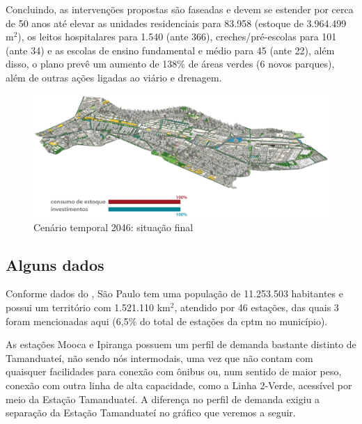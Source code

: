 	Concluindo, as intervenções propostas são faseadas e devem se estender por cerca de 50 anos até elevar as unidades residenciais para 83.958 (estoque de 3.964.499 m$^2$), os leitos hospitalares para 1.540 (ante 366), creches/pré-escolas para 101 (ante 34) e as escolas de ensino fundamental e médio para 45 (ante 22), além disso, o plano prevê um aumento de 138\% de áreas verdes (6 novos parques), além de outras ações ligadas ao viário e drenagem\cite{smdu2014}.
	
	\begin{figure}[h]
		\caption{Cenário temporal 2046: situação final \cite{smdu2014}}
		\includegraphics[keepaspectratio,width=\textwidth]{oucbt_consolidado.png}
	\end{figure}
	
	\subsection{Alguns dados}
	
	Conforme dados do , São Paulo tem uma população de 11.253.503 habitantes e possui um território com 1.521.110 km$^2$, atendido por 46 estações\cite{sitecptm1}, das quais 3 foram mencionadas aqui (6,5\% do total de estações da \gls{cptm} no município).
	
	As estações Mooca e Ipiranga possuem um perfil de demanda bastante distinto de Tamanduateí, não sendo nós intermodais, uma vez que não contam com quaisquer facilidades para conexão com ônibus ou, num sentido de maior peso, conexão com outra linha de alta capacidade, como a Linha 2-Verde, acessível por meio da Estação Tamanduateí. A diferença no perfil de demanda exigiu a separação da Estação Tamanduateí no gráfico que veremos a seguir.
	
